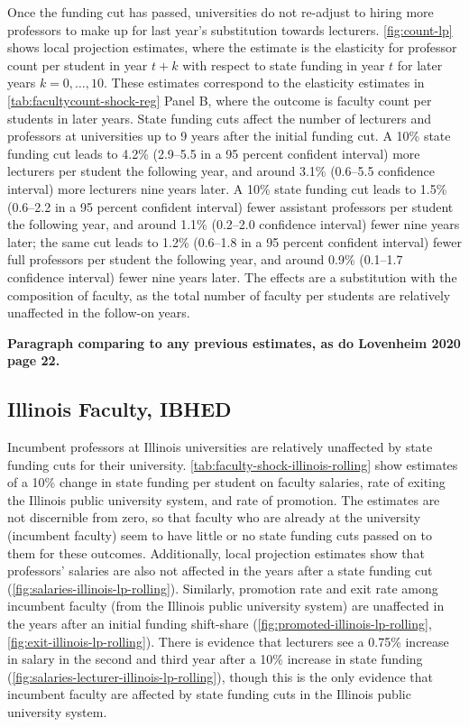 Once the funding cut has passed, universities do not re-adjust to hiring more professors to make up for last year's substitution towards lecturers.
\autoref{fig:count-lp} shows local projection estimates, where the estimate is the elasticity for professor count per student in year $t+k$ with respect to state funding in year $t$ for later years $k = 0, \hdots, 10$.
These estimates correspond to the elasticity estimates in \autoref{tab:facultycount-shock-reg} Panel B, where the outcome is faculty count per students in later years.
State funding cuts affect the number of lecturers and professors at universities up to 9 years after the initial funding cut.
A 10\% state funding cut leads to 4.2\% (2.9--5.5 in a 95 percent confident interval) more lecturers per student the following year, and around 3.1\% (0.6--5.5 confidence interval) more lecturers nine years later.
A 10\% state funding cut leads to 1.5\% (0.6--2.2 in a 95 percent confident interval) fewer assistant professors per student the following year, and around 1.1\% (0.2--2.0 confidence interval) fewer nine years later;
the same cut leads to 1.2\% (0.6--1.8 in a 95 percent confident interval) fewer full professors per student the following year, and around 0.9\% (0.1--1.7 confidence interval) fewer nine years later.
The effects are a substitution with the composition of faculty, as the total number of faculty per students are relatively unaffected in the follow-on years.

\textbf{Paragraph comparing to any previous estimates, as do Lovenheim 2020 page 22.}

\subsection{Illinois Faculty, IBHED}
Incumbent professors at Illinois universities are relatively unaffected by state funding cuts for their university.
\autoref{tab:faculty-shock-illinois-rolling} show estimates of a 10\% change in state funding per student on faculty salaries, rate of exiting the Illinois public university system, and rate of promotion.
The estimates are not discernible from zero, so that faculty who are already at the university (incumbent faculty) seem to have little or no state funding cuts passed on to them for these outcomes.
Additionally, local projection estimates show that professors' salaries are also not affected in the years after a state funding cut (\autoref{fig:salaries-illinois-lp-rolling}).
Similarly, promotion rate and exit rate among incumbent faculty (from the Illinois public university system) are unaffected in the years after an initial funding shift-share (\autoref{fig:promoted-illinois-lp-rolling}, \ref{fig:exit-illinois-lp-rolling}).
There is evidence that lecturers see a 0.75\% increase in salary in the second and third year after a 10\% increase in state funding (\autoref{fig:salaries-lecturer-illinois-lp-rolling}), though this is the only evidence that incumbent faculty are affected by state funding cuts in the Illinois public university system.

